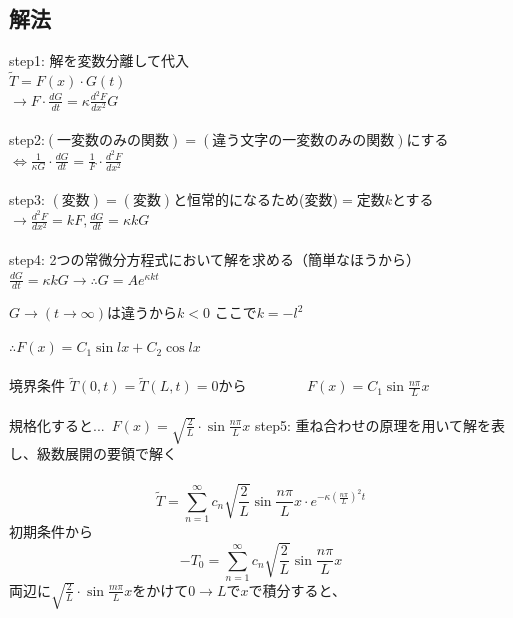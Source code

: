 \documentclass[titlepage,dvipdfmx]{jsarticle}
\begin{document}
\subsection*{解法}
\noindent step1: 解を変数分離して代入\\
$\widetilde{T}= F(x)\cdot G(t)$\\
$\displaystyle \rightarrow F \cdot \frac{d G}{dt}=\kappa \frac{d^2 F}{d x^2}G$\\\\
step2:$(一変数のみの関数)=(違う文字の一変数のみの関数)$にする\\
$\displaystyle \Leftrightarrow \frac{1}{\kappa G}\cdot \frac{d G}{dt}= \frac{1}{F}\cdot \frac{d^2 F}{dx^2}$\\\\
step3: $(変数)=(変数)$と恒常的になるため(変数)$=$定数$k$とする\\
$\displaystyle \rightarrow \frac{d^2 F}{dx^2}=kF , \frac{dG}{dt}=\kappa k G$\\\\
step4: 2つの常微分方程式において解を求める（簡単なほうから）
$\displaystyle \frac{dG}{dt} =\kappa k G \rightarrow \therefore G =Ae^{\kappa k t}$\\
\begin{center}
$G\rightarrow (t\rightarrow \infty)は違うからk<0$ ここで$k=-l^2$
\end{center}
$\therefore F(x)=C_1\sin lx +C_2 \cos lx $ \\\\
境界条件 $\widetilde{T}(0,t)=\widetilde{T}(L,t)=0$から~~~~~~~~
$\displaystyle F(x)=C_1 \sin \frac{n\pi}{L}x$\\\\
規格化すると...~$\displaystyle F(x)=\sqrt{\frac{2}{L}}\cdot \sin \frac{n\pi}{L}x$
step5: 重ね合わせの原理を用いて解を表し、級数展開の要領で解く\\\\
\begin{equation}\displaystyle
\widetilde{T}=\sum_{n=1}^{\infty} c_n \sqrt{\frac{2}{L}} \sin \frac{n\pi}{L}x \cdot e^{-\kappa (\frac{n \pi }{L})^2t}
\nonumber
\end{equation}
初期条件から\\
\begin{equation}\displaystyle
-T_0=\sum_{n=1}^{\infty} c_n \sqrt{\frac{2}{L}} \sin \frac{n\pi}{L}x
\nonumber
\end{equation}
両辺に$\displaystyle \sqrt{\frac{2}{L}}\cdot \sin \frac{m\pi}{L}x$をかけて$0\rightarrow L$で$x$で積分すると、\\
\end{document}
